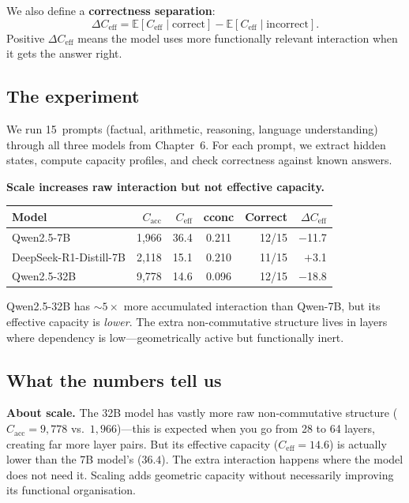 \documentclass[11pt, twoside, openright]{memoir}
\begin{document}
We also define a \textbf{correctness separation}:
\[
  \Delta C_{\mathrm{eff}}
  = \mathbb{E}[C_{\mathrm{eff}} \mid \text{correct}]
  - \mathbb{E}[C_{\mathrm{eff}} \mid \text{incorrect}].
\]
Positive $\Delta C_{\mathrm{eff}}$ means the model uses more functionally
relevant interaction when it gets the answer right.

\subsection{The experiment}

We run 15~prompts (factual, arithmetic, reasoning, language understanding)
through all three models from Chapter~6. For each prompt, we extract hidden
states, compute capacity profiles, and check correctness against known
answers.

\begin{finding}
\textbf{Scale increases raw interaction but not effective capacity.}

\begin{center}
\renewcommand{\arraystretch}{1.3}\small
\begin{tabular}{@{}lrrcrr@{}}
\toprule
\textbf{Model} & $C_{\mathrm{acc}}$ & $C_{\mathrm{eff}}$ &
  cconc & Correct & $\Delta C_{\mathrm{eff}}$ \\
\midrule
Qwen2.5-7B       & 1,966 & 36.4 & 0.211 & 12/15 & $-$11.7 \\
DeepSeek-R1-Distill-7B & 2,118 & 15.1 & 0.210 & 11/15 & $+$3.1 \\
Qwen2.5-32B      & 9,778 & 14.6 & 0.096 & 12/15 & $-$18.8 \\
\bottomrule
\end{tabular}
\end{center}

Qwen2.5-32B has ${\sim}5\times$ more accumulated interaction than Qwen-7B,
but its effective capacity is \emph{lower}. The extra non-commutative
structure lives in layers where dependency is low---geometrically active
but functionally inert.
\end{finding}

\subsection{What the numbers tell us}

\textbf{About scale.}
The 32B model has vastly more raw non-commutative structure
($C_{\mathrm{acc}} = 9{,}778$ vs.\ $1{,}966$)---this is expected when you go
from 28 to 64 layers, creating far more layer pairs. But its effective
capacity ($C_{\mathrm{eff}} = 14.6$) is actually lower than the 7B model's
($36.4$). The extra interaction happens where the model does not need it.
Scaling adds geometric capacity without necessarily improving its
functional organisation.
\end{document}
